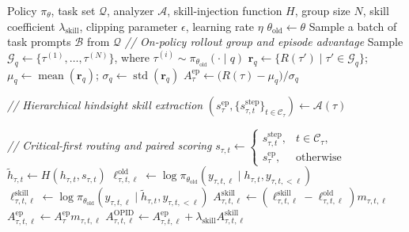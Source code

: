 \begin{algorithm}[t]
\caption{OPID: On-Policy Skill Distillation}
\label{alg:opid}
\footnotesize
\begin{algorithmic}[1]
\Require Policy $\pi_\theta$, task set $\mathcal{Q}$, analyzer $\mathcal{A}$,
skill-injection function $H$, group size $N$, skill coefficient
$\lambda_{\mathrm{skill}}$, clipping parameter $\epsilon$, learning rate $\eta$
    \State $\theta_{\mathrm{old}} \gets \theta$
    \State Sample a batch of task prompts $\mathcal{B}$ from $\mathcal{Q}$
        \State \textcolor{green!50!black}{\textit{// On-policy rollout group and episode advantage}}
        \State Sample $\mathcal{G}_q \gets \{\tau^{(1)},\ldots,\tau^{(N)}\}$,
        where $\tau^{(i)} \sim \pi_{\theta_{\mathrm{old}}}(\cdot\mid q)$
        \State $\mathbf{r}_q \gets \{R(\tau')\mid \tau'\in\mathcal{G}_q\}$;
        $\mu_q \gets \operatorname{mean}(\mathbf{r}_q)$;
        $\sigma_q \gets \operatorname{std}(\mathbf{r}_q)$
            \State $A^{\mathrm{ep}}_{\tau} \gets
            \bigl(R(\tau)-\mu_q\bigr)/\sigma_q$

            \State \textcolor{green!50!black}{\textit{// Hierarchical hindsight skill extraction}}
            \State $\left(s^{\mathrm{ep}}_{\tau},
            \{s^{\mathrm{step}}_{\tau,t}\}_{t\in\mathcal{C}_{\tau}}\right)
            \gets \mathcal{A}(\tau)$

            \State \textcolor{green!50!black}{\textit{// Critical-first routing and paired scoring}}
                \State $s_{\tau,t} \gets
                \begin{cases}
                    s^{\mathrm{step}}_{\tau,t}, & t\in\mathcal{C}_{\tau},\\
                    s^{\mathrm{ep}}_{\tau}, & \text{otherwise}
                \end{cases}$
                \State $\tilde{h}_{\tau,t} \gets H(h_{\tau,t},s_{\tau,t})$
                    \State $\ell^{\mathrm{old}}_{\tau,t,\ell} \gets
                    \log\pi_{\theta_{\mathrm{old}}}
                    (y_{\tau,t,\ell}\mid h_{\tau,t},y_{\tau,t,<\ell})$
                    \State $\ell^{\mathrm{skill}}_{\tau,t,\ell} \gets
                    \log\pi_{\theta_{\mathrm{old}}}
                    (y_{\tau,t,\ell}\mid \tilde{h}_{\tau,t},y_{\tau,t,<\ell})$
                    \State $A^{\mathrm{skill}}_{\tau,t,\ell} \gets
                    (\ell^{\mathrm{skill}}_{\tau,t,\ell}
                    -\ell^{\mathrm{old}}_{\tau,t,\ell})m_{\tau,t,\ell}$
                    \State $A^{\mathrm{ep}}_{\tau,t,\ell} \gets
                    A^{\mathrm{ep}}_{\tau}m_{\tau,t,\ell}$
                    \State $A^{\mathrm{OPID}}_{\tau,t,\ell} \gets
                    A^{\mathrm{ep}}_{\tau,t,\ell}
                    +\lambda_{\mathrm{skill}}A^{\mathrm{skill}}_{\tau,t,\ell}$
                \EndFor
            \EndFor
        \EndFor
    \EndFor


\end{algorithmic}
\end{algorithm}
